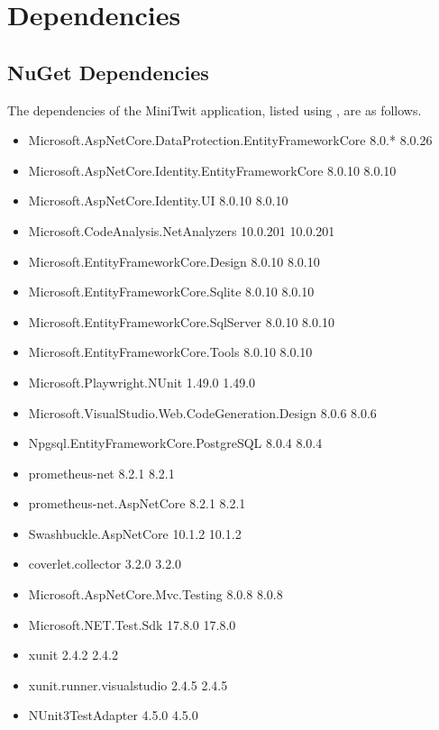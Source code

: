 \section{Dependencies}\label{appendix:dependencies}
\subsection*{NuGet Dependencies}
The dependencies of the MiniTwit application, listed using , are as follows.
\begin{itemize}
    \item Microsoft.AspNetCore.DataProtection.EntityFrameworkCore      8.0.*       8.0.26  
    \item Microsoft.AspNetCore.Identity.EntityFrameworkCore            8.0.10      8.0.10  
    \item Microsoft.AspNetCore.Identity.UI                             8.0.10      8.0.10  
    \item Microsoft.CodeAnalysis.NetAnalyzers                          10.0.201    10.0.201
    \item Microsoft.EntityFrameworkCore.Design                         8.0.10      8.0.10  
    \item Microsoft.EntityFrameworkCore.Sqlite                         8.0.10      8.0.10 
    \item Microsoft.EntityFrameworkCore.SqlServer                      8.0.10      8.0.10  
    \item Microsoft.EntityFrameworkCore.Tools                          8.0.10      8.0.10  
    \item Microsoft.Playwright.NUnit                                   1.49.0      1.49.0 
    \item Microsoft.VisualStudio.Web.CodeGeneration.Design             8.0.6       8.0.6    
    \item Npgsql.EntityFrameworkCore.PostgreSQL                        8.0.4       8.0.4 
    \item prometheus-net                                               8.2.1       8.2.1    
    \item prometheus-net.AspNetCore                                    8.2.1       8.2.1 
    \item Swashbuckle.AspNetCore                                       10.1.2      10.1.2  
    \item coverlet.collector                                           3.2.0       3.2.0  
    \item Microsoft.AspNetCore.Mvc.Testing      8.0.8       8.0.8  
    \item Microsoft.NET.Test.Sdk                17.8.0      17.8.0  
    \item xunit                                 2.4.2       2.4.2   
    \item xunit.runner.visualstudio             2.4.5       2.4.5   
    \item NUnit3TestAdapter               4.5.0       4.5.0  
\end{itemize}

